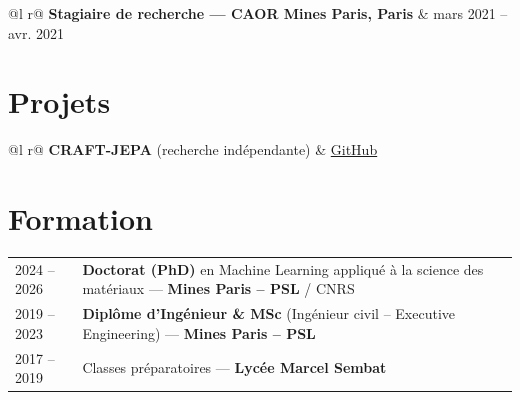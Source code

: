 \documentclass[a4paper,11pt]{article}
\begin{document}
\begin{tabularx}{\linewidth}{ @{}l r@{} }
\textbf{Stagiaire de recherche --- CAOR Mines Paris, Paris} & \hfill mars 2021 -- avr. 2021 \\[2pt]
\end{tabularx}

\section{Projets}

\begin{tabularx}{\linewidth}{ @{}l r@{} }
\textbf{CRAFT-JEPA} (recherche indépendante) & \hfill \href{https://github.com/Rxzh/craft-jepa}{GitHub} \\[2pt]
\end{tabularx}

\section{Formation}
\begin{tabularx}{\linewidth}{@{}l X@{}}
2024 -- 2026 & \textbf{Doctorat (PhD)} en Machine Learning appliqué à la science des matériaux --- \textbf{Mines Paris -- PSL} / CNRS \\[-2pt]
2019 -- 2023 & \textbf{Diplôme d'Ingénieur \& MSc} (Ingénieur civil -- Executive Engineering) --- \textbf{Mines Paris -- PSL} \\[-2pt]
2017 -- 2019 & Classes préparatoires --- \textbf{Lycée Marcel Sembat} \\
\end{tabularx}
\end{document}
